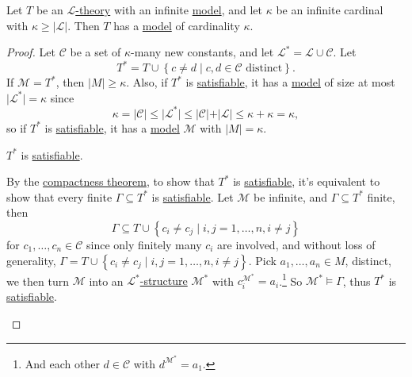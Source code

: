 \begin{proposition}\label{prop:lec10}
	Let \(T\) be an \hyperref[def:theory]{\(\mathcal{L}\)-theory} with an infinite \hyperref[def:model]{model}, and let \(\kappa \) be an infinite cardinal with \(\kappa \geq \vert \mathcal{L}  \vert \). Then \(T\) has a \hyperref[def:model]{model} of cardinality \(\kappa \).
\end{proposition}
\begin{proof}
	Let \(\mathcal{C} \) be a set of \(\kappa \)-many new constants, and let \(\mathcal{L} ^{\ast} = \mathcal{L} \cup \mathcal{C} \). Let
	\[
		T^{\ast} = T \cup \left\{ c \neq d \mid c, d\in \mathcal{C} \text{ distinct}  \right\} .
	\]
	If \(\mathcal{M} = T^{\ast} \), then \(\vert M \vert \geq \kappa \). Also, if \(T^{\ast} \) is \hyperref[def:satisfiable]{satisfiable}, it has a \hyperref[def:model]{model} of size at most \(\vert \mathcal{L} ^{\ast} \vert = \kappa \) since
	\[
		\kappa = \vert \mathcal{C} \vert \leq \vert \mathcal{L} ^{\ast} \vert \leq \vert \mathcal{C} \vert + \vert \mathcal{L} \vert \leq \kappa + \kappa = \kappa ,
	\]
	so if \(T^{\ast} \) is \hyperref[def:satisfiable]{satisfiable}, it has a \hyperref[def:model]{model} \(\mathcal{M} \) with \(\vert M \vert = \kappa \).

	\begin{claim}
		\(T^{\ast} \) is \hyperref[def:satisfiable]{satisfiable}.
	\end{claim}
	\begin{explanation}
		By the \hyperref[thm:compactness]{compactness theorem}, to show that \(T^{\ast} \) is \hyperref[def:satisfiable]{satisfiable}, it's equivalent to show that every finite \(\Gamma \subseteq T^{\ast} \) is \hyperref[def:satisfiable]{satisfiable}. Let \(\mathcal{M} \) be infinite, and \(\Gamma \subseteq T^{\ast} \) finite, then
		\[
			\Gamma \subseteq T \cup \left\{ c_i \neq c_j \mid i, j = 1, \ldots , n, i \neq j \right\}
		\]
		for \(c_1, \ldots , c_n\in \mathcal{C} \) since only finitely many \(c_i\) are involved, and without loss of generality, \(\Gamma = T \cup \left\{ c_i \neq c_j \mid i, j=1, \ldots , n, i \neq j \right\} \). Pick \(a_1, \ldots , a_n\in M\), distinct, we then turn \(\mathcal{M} \) into an \hyperref[def:structure]{\(\mathcal{L} ^{\ast} \)-structure} \(\mathcal{M} ^{\ast} \) with \(c_i ^{\mathcal{M} ^{\ast} } = a_i\).\footnote{And each other \(d\in \mathcal{C} \) with \(d^{\mathcal{M} ^{\ast} } = a_1\).} So \(\mathcal{M} ^{\ast} \models \Gamma \), thus \(T^{\ast} \) is \hyperref[def:satisfiable]{satisfiable}.
	\end{explanation}
\end{proof}